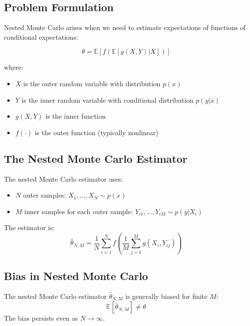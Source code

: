 \begin{notechapter}
\subsection{Problem Formulation}

Nested Monte Carlo arises when we need to estimate expectations of functions of conditional expectations:

\begin{equation}
\theta = \mathbb{E}[f(\mathbb{E}[g(X,Y)|X])]
\end{equation}

where:
\begin{itemize}
\item $X$ is the outer random variable with distribution $p(x)$
\item $Y$ is the inner random variable with conditional distribution $p(y|x)$
\item $g(X,Y)$ is the inner function
\item $f(\cdot)$ is the outer function (typically nonlinear)
\end{itemize}

\subsection{The Nested Monte Carlo Estimator}

The nested Monte Carlo estimator uses:
\begin{itemize}
\item $N$ outer samples: $X_1, \ldots, X_N \sim p(x)$
\item $M$ inner samples for each outer sample: $Y_{i1}, \ldots, Y_{iM} \sim p(y|X_i)$
\end{itemize}

The estimator is:
\begin{equation}
\hat{\theta}_{N,M} = \frac{1}{N} \sum_{i=1}^N f\left(\frac{1}{M} \sum_{j=1}^M g(X_i, Y_{ij})\right)
\end{equation}

\subsection{Bias in Nested Monte Carlo}

\begin{theorem}
The nested Monte Carlo estimator $\hat{\theta}_{N,M}$ is generally biased for finite $M$:
\begin{equation}
\mathbb{E}[\hat{\theta}_{N,M}] \neq \theta
\end{equation}
The bias persists even as $N \to \infty$.
\end{theorem}


\end{notechapter}
